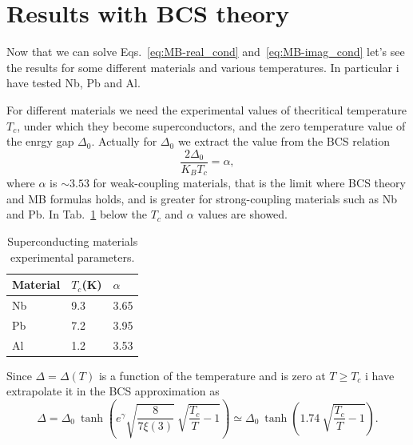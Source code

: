 \documentclass[a4paper,11pt]{book}
\begin{document}


\chapter*{Results with BCS theory}
Now that we can solve Eqs.~\ref{eq:MB-real_cond} and~\ref{eq:MB-imag_cond} let's see the results for some 
different materials and various temperatures. In particular i have tested Nb, Pb and Al.

For different materials we need the experimental values of thecritical temperature $T_c$, under which they become superconductors, and the zero temperature value of the enrgy gap $\Delta_0$.
Actually for $\Delta_0$ we extract the value from the BCS relation
\begin{equation}
    \frac{2\Delta_0}{K_BT_c} = \alpha,
\end{equation}
where $\alpha$ is $\sim 3.53$ for weak-coupling materials, that is the limit where BCS theory and MB formulas
holds, and is greater for strong-coupling materials such as Nb and Pb. In Tab.~\ref{tab:T_c} below the $T_c$ and $\alpha$ values are showed.


\begin{table}[]
\centering
\caption{Superconducting materials experimental parameters.}
\begin{tabular}{@{}lll@{}}
\toprule
Material & $T_c$(K) & $\alpha$ \\ \midrule
Nb       & 9.3      & 3.65     \\
Pb       & 7.2      & 3.95     \\
Al       & 1.2      & 3.53     \\ \bottomrule
\end{tabular}
\label{tab:T_c}
\end{table}

Since $\Delta = \Delta (T)$ is a function of the temperature and is zero at $T \geq T_c$ i have extrapolate it in the BCS approximation as
\begin{equation}
    \Delta = \Delta_0~\tanh \left(e^{\gamma}\sqrt{\frac{8}{7\xi (3)}}~\sqrt{\frac{T_c}{T} - 1} \right) \simeq \Delta_0~\tanh \left(1.74~\sqrt{\frac{T_c}{T} - 1}\right).
    \label{eq:BCS_gap_approx}
\end{equation}
\end{document}
